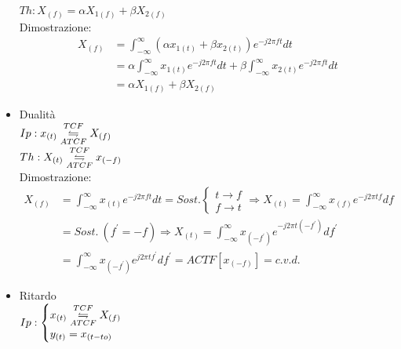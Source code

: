 \begin{itemize}
{                    $Th: X_{(f)} = \alpha X_{1(f)} + \beta X_{2(f)}$\\ 
                    Dimostrazione:
                    \begin{align}
                        X_{(f)} & = \int_{-\infty}^{\infty} (\alpha x_{1(t)} + \beta x_{2(t)}) e^{-j2\pi ft} dt \nonumber \\
                                & = \alpha \int_{-\infty}^{\infty} x_{1(t)} e^{-j2\pi ft} dt + \beta \int_{-\infty}^{\infty}  x_{2(t)} e^{-j2\pi ft} dt  \nonumber \\
                                & = \alpha X_{1(f)} + \beta X_{2(f)} \nonumber
                    \end{align}
    
                }
                \item{Dualità\\
                    $Ip: x_{(t)} \overunderset{TCF}{ATCF}{\leftrightharpoons} X_{(f)}$\\        
                    $Th: X_{(t)} \overunderset{TCF}{ATCF}{\leftrightharpoons} x_{(-f)}$ \\
                    Dimostrazione:
                    \begin{align}
                        X_{(f)} & = \int_{-\infty}^{\infty} x_{(t)} e^{-j2\pi ft} dt = Sost. \begin{cases}
                            t \rightarrow f\\
                            f \rightarrow t
                        \end{cases} \Rightarrow  X_{(t)} = \int_{-\infty}^{\infty} x_{(f)} e^{-j2\pi tf} df \nonumber \\
                                & =Sost.\ (f^\prime = -f) \Rightarrow  X_{(t)} = \int_{-\infty}^{\infty} x_{(-f^\prime)} e^{-j2\pi t(-f^\prime)} df^\prime\nonumber \\
                                & =\int_{-\infty}^{\infty} x_{(-f^\prime)} e^{j2\pi tf^\prime} df^\prime= ACTF[x_{(-f)}] = c.v.d.  \nonumber
                    \end{align}
                }
                \item{Ritardo\\
                    $Ip: \begin{cases}
                        x_{(t)} \overunderset{TCF}{ATCF}{\leftrightharpoons} X_{(f)} \nonumber \\
                        y_{(t)} = x_{(t-to)} \nonumber
                    \end{cases}$\\
}
\end{itemize}
